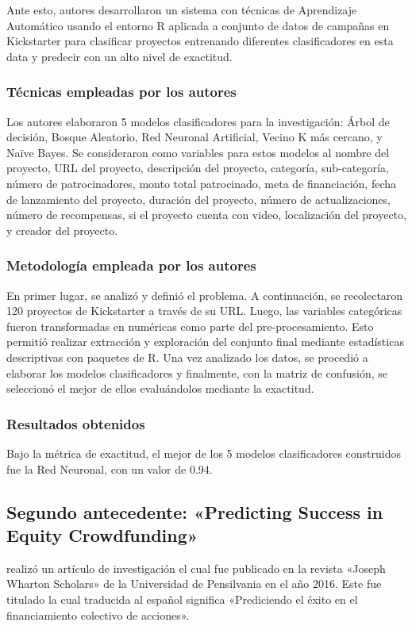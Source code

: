 Ante esto, autores desarrollaron un sistema con técnicas de Aprendizaje Automático usando el entorno R aplicada a conjunto de datos de campañas en Kickstarter para clasificar proyectos entrenando diferentes clasificadores en esta data y predecir con un alto nivel de exactitud.

\subsubsection{Técnicas empleadas por los autores}
Los autores elaboraron 5 modelos clasificadores para la investigación: Árbol de decisión, Bosque Aleatorio, Red Neuronal Artificial, Vecino K más cercano, y Naïve Bayes. Se consideraron como variables para estos modelos al nombre del proyecto, URL del proyecto, descripción del proyecto, categoría, sub-categoría, número de patrocinadores, monto total patrocinado, meta de financiación, fecha de lanzamiento del proyecto, duración del proyecto, número de actualizaciones, número de recompensas, si el proyecto cuenta con video, localización del proyecto, y creador del proyecto.

\subsubsection{Metodología empleada por los autores}
En primer lugar, se analizó y definió el problema. A continuación, se recolectaron 120 proyectos de Kickstarter a través de su URL. Luego, las variables categóricas fueron transformadas en numéricas como parte del pre-procesamiento. Esto permitió realizar extracción y exploración del conjunto final mediante estadísticas descriptivas con paquetes de R. Una vez analizado los datos, se procedió a elaborar los modelos clasificadores y finalmente, con la matriz de confusión, se seleccionó el mejor de ellos evaluándolos mediante la exactitud.

\subsubsection{Resultados obtenidos}
Bajo la métrica de exactitud, el mejor de los 5 modelos clasificadores construidos fue la Red Neuronal, con un valor de 0.94.


\subsection{Segundo antecedente: «Predicting Success in Equity Crowdfunding» \citep*{pr_beckwith2016predcrowd}}
\citeauthor{pr_beckwith2016predcrowd} realizó un artículo de investigación el cual fue publicado en la revista «Joseph Wharton Scholars» de la Universidad de Pensilvania en el año 2016. Este fue titulado  la cual traducida al español significa «Prediciendo el éxito en el financiamiento colectivo de acciones».

